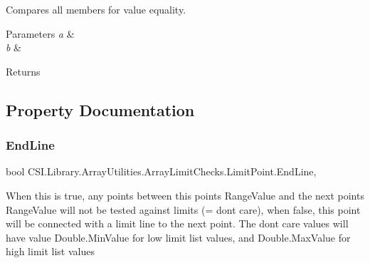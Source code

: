 Compares all members for value equality. 


\begin{DoxyParams}{Parameters}
{\em a} & \\
\hline
{\em b} & \\
\hline
\end{DoxyParams}
\begin{DoxyReturn}{Returns}

\end{DoxyReturn}


\subsection{Property Documentation}
\mbox{\label{class_c_s_i_1_1_library_1_1_array_utilities_1_1_array_limit_checks_1_1_limit_point_a54f1aa045febf7425660b0e4ad79d2d0}} 
\subsubsection{\texorpdfstring{EndLine}{EndLine}}
{\footnotesize\ttfamily bool C\+S\+I.\+Library.\+Array\+Utilities.\+Array\+Limit\+Checks.\+Limit\+Point.\+End\+Line\hspace{0.3cm}{\ttfamily [get]}, {\ttfamily [set]}}



When this is true, any points between this point\textquotesingle{}s Range\+Value and the next point\textquotesingle{}s Range\+Value will not be tested against limits (= don\textquotesingle{}t care), when false, this point will be connected with a limit line to the next point. The don\textquotesingle{}t care values will have value Double.\+Min\+Value for low limit list values, and Double.\+Max\+Value for high limit list values 

\mbox{\label{class_c_s_i_1_1_library_1_1_array_utilities_1_1_array_limit_checks_1_1_limit_point_a10dca35d12bbec7356f7861eb952c46b}} 
